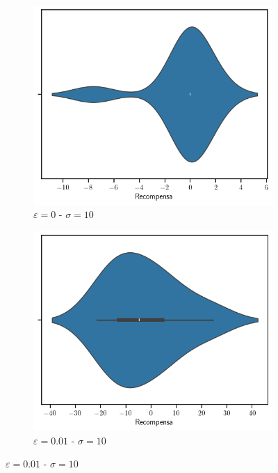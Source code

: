\documentclass[12pt]{article}
\begin{document}
\begin{figure}[]
        \begin{subfigure}[H]{0.3\textwidth}
            \includegraphics[width=\textwidth]{../img/values_sigma_10_epsilon_0}
            \caption{$\varepsilon=0$ - $\sigma=10$}
            \label{fig:estimations_6}
        \end{subfigure}
        \begin{subfigure}[H]{0.3\textwidth}
            \includegraphics[width=\textwidth]{../img/values_sigma_10_epsilon_0.01}
            \caption{$\varepsilon=0.01$ - $\sigma=10$}
            \label{fig:estimations_7}

\end{subfigure}
\end{figure}
\end{document}
